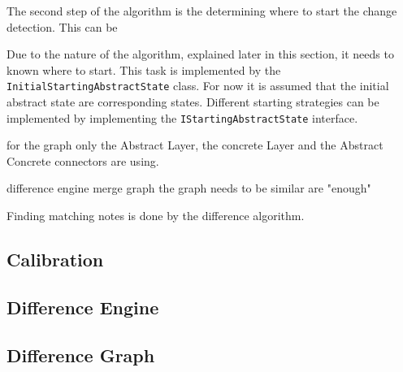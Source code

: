 
The second step of the algorithm is the determining where to start the change detection. This can be 

Due to the nature of the algorithm, explained later in this section, it needs to known where to start. This task is implemented by the \verb|InitialStartingAbstractState| class. For now it is assumed that the initial abstract state are corresponding states. Different starting strategies can be implemented by implementing the \verb|IStartingAbstractState| interface. 









for the graph only the Abstract Layer, the concrete Layer and the Abstract Concrete connectors are using. 


difference engine
merge graph \cite{andrews2009visual}
the graph needs to be similar are "enough"

Finding matching notes is done by the difference algorithm. 




\subsection{Calibration}
\subsection{Difference Engine}
\subsection{Difference Graph}
